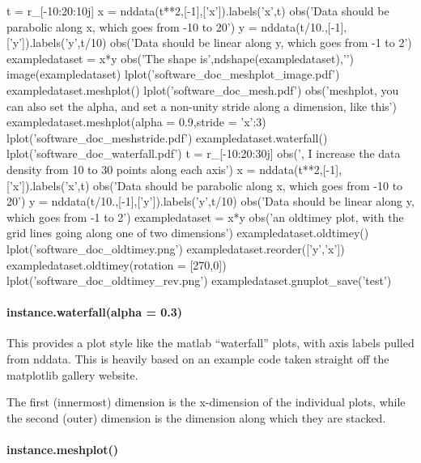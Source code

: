 \begin{python}
t = r_[-10:20:10j]
x = nddata(t**2,[-1],['x']).labels('x',t)
obs('Data should be parabolic along x, which goes from -10 to 20\n\n')
y = nddata(t/10.,[-1],['y']).labels('y',t/10)
obs('Data should be linear along y, which goes from -1 to 2\n\n')
exampledataset = x*y
obs('The shape is',ndshape(exampledataset),'\n\n')
image(exampledataset)
lplot('software_doc_meshplot_image.pdf')
exampledataset.meshplot()
lplot('software_doc_mesh.pdf')
obs('\n\nFor meshplot, you can also set the alpha, and set a non-unity stride along a dimension, like this\n\n')
exampledataset.meshplot(alpha = 0.9,stride = {'x':3})
lplot('software_doc_meshstride.pdf')
exampledataset.waterfall()
lplot('software_doc_waterfall.pdf')
t = r_[-10:20:30j]
obs('\n\nHere, I increase the data density from 10 to 30 points along each axis\n\n')
x = nddata(t**2,[-1],['x']).labels('x',t)
obs('Data should be parabolic along x, which goes from -10 to 20\n\n')
y = nddata(t/10.,[-1],['y']).labels('y',t/10)
obs('Data should be linear along y, which goes from -1 to 2\n\n')
exampledataset = x*y
obs('\n\nShow an oldtimey plot, with the grid lines going along one of two dimensions\n\n')
exampledataset.oldtimey()
lplot('software_doc_oldtimey.png')
exampledataset.reorder(['y','x'])
exampledataset.oldtimey(rotation = [270,0])
lplot('software_doc_oldtimey_rev.png')
exampledataset.gnuplot_save('test')
\end{python}
\paragraph{instance.waterfall(alpha = 0.3)}
This provides a plot style like the matlab ``waterfall'' plots,
    with axis labels pulled from nddata.
This is heavily based on an example code taken straight
    off the matplotlib gallery website.

The first (innermost) dimension is the x-dimension of the
    individual plots,
    while the second (outer) dimension is the dimension along
    which they are stacked.

\paragraph{instance.meshplot()}

